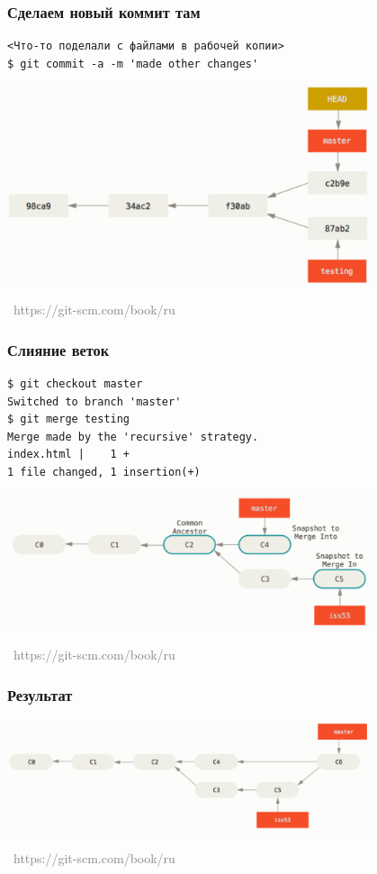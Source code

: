 \documentclass[xetex,mathserif,serif]{beamer}
\newcommand{\attribution}[1] {
	\vspace{-5mm}\begin{flushright}\begin{scriptsize}\textcolor{gray}{\textcopyright\, #1}\end{scriptsize}\end{flushright}
}
\begin{document}
	\begin{frame}[fragile]
		\frametitle{Сделаем новый коммит там}
		\begin{verbatim}
<Что-то поделали с файлами в рабочей копии>
$ git commit -a -m 'made other changes'
		\end{verbatim}
		\begin{center}
			\includegraphics[width=0.8\textwidth]{newCommitToMaster.png}
			\attribution{https://git-scm.com/book/ru}
		\end{center}
	\end{frame}

	\begin{frame}[fragile]
		\frametitle{Слияние веток}
		\begin{verbatim}
$ git checkout master
Switched to branch 'master'
$ git merge testing
Merge made by the 'recursive' strategy.
index.html |    1 +
1 file changed, 1 insertion(+)
		\end{verbatim}
		\begin{center}
			\includegraphics[width=0.8\textwidth]{merge.png}
			\attribution{https://git-scm.com/book/ru}
		\end{center}
	\end{frame}

	\begin{frame}
		\frametitle{Результат}
		\begin{center}
			\includegraphics[width=0.8\textwidth]{mergeResult.png}
			\attribution{https://git-scm.com/book/ru}
		\end{center}
	\end{frame}
\end{document}
